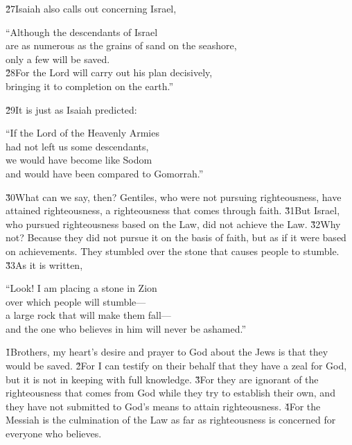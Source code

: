 \v{27}Isaiah also calls out concerning Israel,

\begin{poetry}
\poeml ``Although the descendants of Israel \\
\poemll    are as numerous as the grains of sand on the seashore, \\
\poemlll       only a few will be saved. \\
\poeml \v{28}For the Lord will carry out his plan decisively, \\
\poemll    bringing it to completion on the earth.''
\end{poetry}

\v{29}It is just as Isaiah predicted:

\begin{poetry}
\poeml ``If the Lord of the Heavenly Armies \\
\poemll    had not left us some descendants, \\
\poemlll       we would have become like Sodom \\
\poemlll       and would have been compared to Gomorrah.''
\end{poetry}

\v{30}What can we say, then? Gentiles, who were not pursuing righteousness, have attained righteousness, a righteousness that comes through faith. \v{31}But Israel, who pursued righteousness based on the Law, did not achieve the Law. \v{32}Why not? Because they did not pursue it on the basis of faith, but as if it were based on achievements. They stumbled over the stone that causes people to stumble. \v{33}As it is written,

\begin{poetry}
\poeml ``Look! I am placing a stone in Zion \\
\poemll    over which people will stumble--- \\
\poeml a large rock that will make them fall--- \\
\poemll    and the one who believes in him will never be ashamed.''
\end{poetry}

\v{1}Brothers, my heart's desire and prayer to God about the Jews is that they would be saved. \v{2}For I can testify on their behalf that they have a zeal for God, but it is not in keeping with full knowledge. \v{3}For they are ignorant of the righteousness that comes from God while they try to establish their own, and they have not submitted to God's means to attain righteousness. \v{4}For the Messiah is the culmination of the Law as far as righteousness is concerned for everyone who believes.

